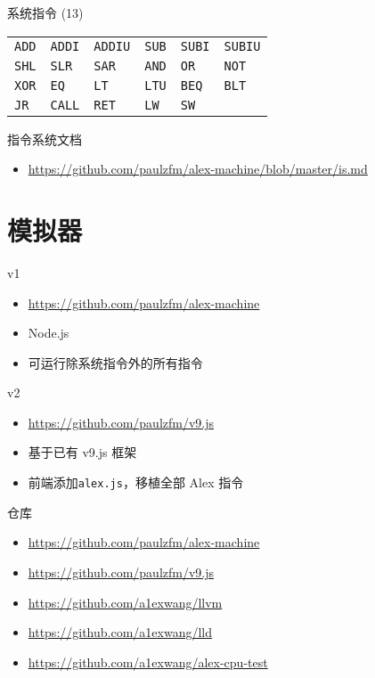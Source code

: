 \documentclass{beamer}
\renewcommand{\t}{\texttt}
\begin{document}
\begin{frame}{系统指令 (13)}
    \begin{center}
    \begin{tabular}{llllll}
        \t{ADD} & \t{ADDI} & \t{ADDIU} & \t{SUB} & \t{SUBI} & \t{SUBIU} \\
        \t{SHL} & \t{SLR} & \t{SAR} & \t{AND} & \t{OR} & \t{NOT} \\
        \t{XOR} & \t{EQ} & \t{LT} & \t{LTU} & \t{BEQ} & \t{BLT} \\
        \t{JR}  & \t{CALL} & \t{RET} & \t{LW} & \t{SW} & \\
    \end{tabular}
    \end{center}
\end{frame}

\begin{frame}{指令系统文档}
    \begin{itemize}
        \item \url{https://github.com/paulzfm/alex-machine/blob/master/is.md}
    \end{itemize}
\end{frame}

\section{模拟器}

\begin{frame}{v1}
    \begin{itemize}
        \item \url{https://github.com/paulzfm/alex-machine}
        \item Node.js
        \item 可运行除系统指令外的所有指令
    \end{itemize}
\end{frame}

\begin{frame}{v2}
    \begin{itemize}
        \item \url{https://github.com/paulzfm/v9.js}
        \item 基于已有 v9.js 框架
        \item 前端添加\t{alex.js}，移植全部 Alex 指令
    \end{itemize}
\end{frame}

\begin{frame}{仓库}
    \begin{itemize}
        \item \url{https://github.com/paulzfm/alex-machine}
        \item \url{https://github.com/paulzfm/v9.js}
        \item \url{https://github.com/a1exwang/llvm}
        \item \url{https://github.com/a1exwang/lld}
        \item \url{https://github.com/a1exwang/alex-cpu-test}
    \end{itemize}
\end{frame}
\end{document}
